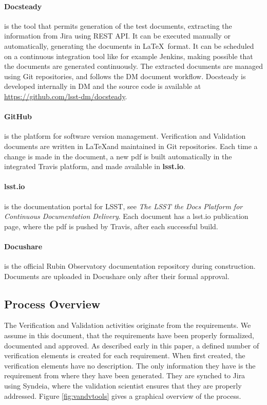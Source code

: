 \paragraph{Docsteady}
is the tool that permits generation of the test documents, extracting the information from Jira using REST API.
It can be executed manually or automatically, generating the documents in \LaTeX~format.
It can be scheduled on a continuous integration tool like for example Jenkins, making possible that 
the documents are generated continuously.
The extracted documents are managed using Git repositories, and follows the  DM document workflow.
Docsteady is developed internally in DM and the source code is available at \url{https://github.com/lsst-dm/docsteady}.

\paragraph{GitHub}
is the platform for software version management.
Verification and Validation documents are written in \LaTeX and maintained in Git repositories.
Each time a change is made in the document, a new pdf is built automatically in the integrated Travis platform, and made available in \textbf{lsst.io}.

\paragraph{lsst.io}
is the documentation portal for LSST, see \textit{The LSST the Docs Platform for Continuous Documentation Delivery}\cite{SQR-006}.
Each document has a lsst.io publication page, where the pdf is pushed by Travis, after each successful build.

\paragraph{Docushare}
is the official Rubin Observatory documentation repository during construction.
Documents are uploaded in Docushare only after their formal approval.


\subsection{Process Overview}\label{sec:proc}

The Verification and Validation activities originate from the requirements.
We assume in this document, that the requirements have been properly formalized, documented and approved.
As described early in this paper, a defined number of verification elements is created for each requirement.
When first created, the verification elements have no description. The only information they have is the requirement from where they have been generated.
They are synched to Jira using Syndeia, where the validation scientist ensures that they are properly addressed.
Figure  \ref{fig:vandvtools} gives a graphical overview of the process.

